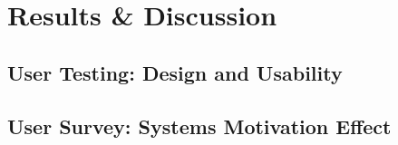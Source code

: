 
\chapter{Results \& Discussion}


\section{User Testing: Design and Usability}


\section{User Survey: Systems Motivation Effect}




\cleardoublepage